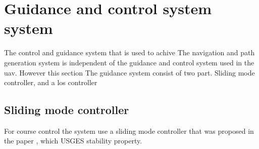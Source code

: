 \section{Guidance and control system system}
The control and guidance system that is used to achive 
The navigation and path generation system is independent of the guidance and control system used in the \gls{uav}. However this section 
The guidance system consist of two part. Sliding mode controller, and a los controller

\subsection{Sliding mode controller}
For course control the system use a sliding mode controller that was proposed in the paper \citep{fortuna2015cascaded}, which USGES stability property.